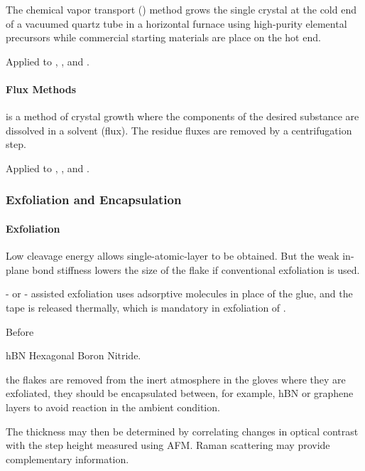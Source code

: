 \documentclass[hidelinks]{article}
\let\oldce\ce
\def\ce#1{{\textsf{\color{dcyan}\oldce{#1}}}}
\begin{document}
The chemical vapor transport () method grows the single crystal at the cold end of a vacuumed quartz tube in a horizontal furnace using high-purity elemental precursors while commercial starting materials are place on the hot end.
\par
Applied to , , and .


\paragraph{Flux Methods} %
\label{par:flux_methods}

 is a method of crystal growth where the components of the desired substance are dissolved in a solvent (flux). The residue fluxes are removed by a centrifugation step.
\par
Applied to , , and .



\subsubsection{Exfoliation and Encapsulation} %
\label{ssub:exfoliation_and_encapsulation}

\paragraph{Exfoliation} %
\label{par:exfoliation}

Low cleavage energy allows single-atomic-layer to be obtained. But the weak in-plane bond stiffness lowers the size of the flake if conventional exfoliation is used.
\par
{}- or - assisted exfoliation  uses adsorptive molecules in place of the glue, and the tape is released thermally, which is mandatory in exfoliation of .
\par
Before \begin{margindef}{hBN}
    Hexagonal Boron Nitride.
\end{margindef} the flakes are removed from the inert atmosphere in the gloves where they are exfoliated, they should be encapsulated between, for example, hBN or graphene layers to avoid reaction in the ambient condition.
\par
The thickness may then be determined by correlating changes in optical contrast with the step height measured using AFM. Raman scattering may provide complementary information.
\end{document}
